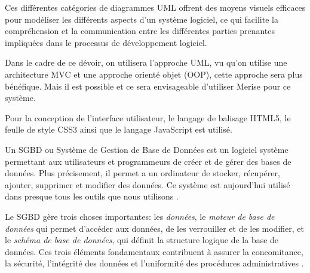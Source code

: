 Ces différentes catégories de diagrammes UML offrent des moyens visuels efficaces pour modéliser les différents aspects d'un système logiciel, ce qui facilite la compréhension et la communication entre les différentes parties prenantes impliquées dans le processus de développement logiciel.

Dans le cadre de ce dévoir, on utilisera l'approche UML, vu qu'on utilise une architecture MVC et une approche orienté objet (OOP), cette approche sera plus bénéfique. Mais il est possible et ce sera envisageable d'utiliser Merise pour ce système.

Pour la conception de l'interface utilisateur, le langage de balisage HTML5, le feulle de style CSS3 ainsi que le langage JavaScript est utilisé.

Un SGBD ou Système de Gestion de Base de Données est un logiciel système permettant aux utilisateurs et programmeurs de créer et de gérer des bases de données. Plus précisement, il permet a un ordinateur de stocker, récupérer,
ajouter, supprimer et modifier des données. Ce système est aujourd’hui utilisé dans presque tous les outils que nous utilisons \citep*{oracleDB}.

Le SGBD gère trois choses importantes: les \emph{données}, le \emph{moteur de base de données} qui permet d'accéder aux données, de les verrouiller et de les modifier, et le \emph{schéma de base de données}, qui définit la structure logique de la base de données. Ces trois éléments fondamentaux contribuent à assurer la concomitance, la sécurité, l'intégrité des données et l'uniformité des procédures administratives \citep*{oracleDB}.


